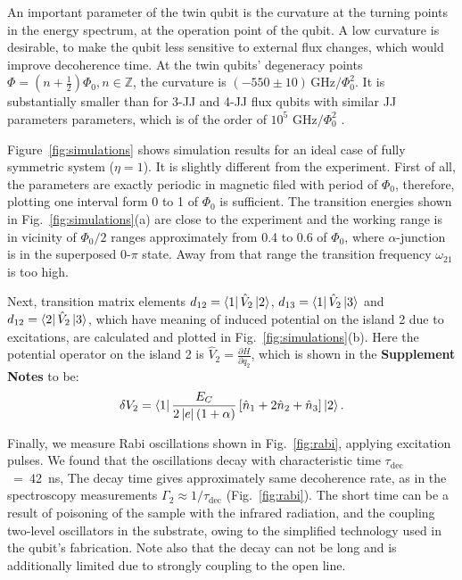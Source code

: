 \documentclass[%
reprint,
superscriptaddress,
bibnotes,
amsmath,
amssymb,
aps,
showkeys,
prb,
]{revtex4-2}
\newcommand{\iket}[1]{\ensuremath{\Ket{#1}}}
\newcommand{\ibra}[1]{\ensuremath{\Bra{#1}}}
\newcommand{\iabs}[1]{\ensuremath{\left|#1\right|}}
\begin{document}
An  important  parameter of the twin qubit is  the curvature  at the  turning points  in the
energy  spectrum, at  the operation  point  of the  qubit.  A  low curvature  is
desirable, to  make the  qubit less  sensitive to  external flux  changes, which
would  improve  decoherence  time.   At   the  twin  qubits'  degeneracy  points
$      \Phi     =      (n+\frac{1}{2})\Phi_0,     n\in\mathbb{Z}      $,     the      curvature     is
$   (-550\pm10)\,\text{GHz}/\Phi_0^2  $.    It is substantially smaller than for 3-JJ and 4-JJ flux qubits with 
similar JJ parameters parameters, which is of the order of 
$ 10^5$ $  \text{GHz}/\Phi_0^2$ \cite{Astafiev_2010, Stern_2014, Gustavsson_2012}. 

Figure~\ref{fig:simulations} shows simulation results for an ideal case of fully symmetric system ($\eta=1$). 
It is slightly different from the experiment. First of all, the parameters are exactly periodic in magnetic filed with period of $\Phi_0$, therefore, 
plotting one interval form 0 to 1 of $\Phi_0$ is sufficient. The transition energies shown in Fig.~\ref{fig:simulations}(a) are close to the experiment and the working range is in vicinity of $\Phi_0/2$ ranges approximately from 0.4 to 0.6 of $\Phi_0$, where $\alpha$-junction is in the superposed 0-$\pi$ state\cite{Shulga_2018}. Away from that range the transition frequency $\omega_{21}$ is too high.

Next, transition matrix elements $d_{12} = \ibra{1}\hat{V}_2\iket{2}$, $d_{13} = \ibra{1}\hat{V}_2\iket{3}$ and $d_{12} = \ibra{2}\hat{V}_2\iket{3}$, which have meaning of induced potential on the island 2 due to excitations, are calculated and plotted in Fig.~\ref{fig:simulations}(b). Here the potential operator on the island 2 is $\hat{V}_2 = \frac{\partial H}{\partial q_2}$, which is shown in the \textbf{Supplement Notes} to be:
\begin{equation}
  \label{eq:dv2}
  \delta     V_2     =\ibra{1}\frac{E_{C}}{2\iabs{e}(1+\alpha)}\left[\hat{n}_1     +     2\hat{n}_2     +
    \hat{n}_3\right]\iket{2}.
\end{equation}


Finally, we measure Rabi oscillations shown in Fig.~\ref{fig:rabi}, applying excitation pulses. We found that the oscillations decay with characteristic time $\tau_{\text{dec}}$~=~42~ns, 
The decay time gives approximately same decoherence rate, as in the spectroscopy measurements $\Gamma_2\approx1/\tau_{\text{dec}}$ (Fig.~\ref{fig:rabi}). 
The short time can be a result of poisoning of  the sample
with  the infrared  radiation, and  the  coupling two-level  oscillators in  the
substrate, owing to the simplified technology used in the qubit's fabrication. Note also that the decay can not be long and is additionally limited due to strongly coupling to the open line. 
\end{document}

